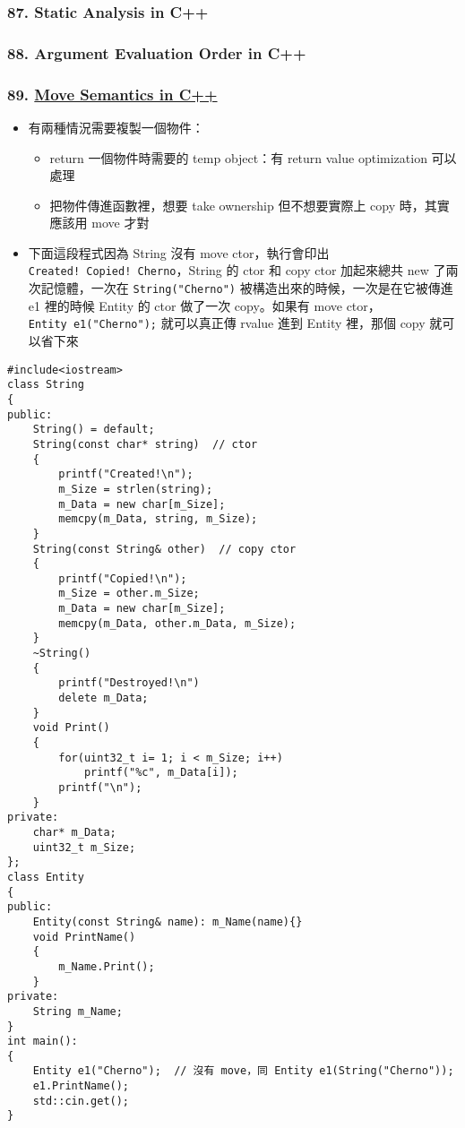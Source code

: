 \documentclass[11pt]{article}
\providecommand{\tightlist}{%
      \setlength{\itemsep}{0pt}\setlength{\parskip}{0pt}}
\begin{document}
\hypertarget{static-analysis-in-c}{%
\subsubsection{87. Static Analysis in C++}\label{static-analysis-in-c}}

\hypertarget{argument-evaluation-order-in-c}{%
\subsubsection{88. Argument Evaluation Order in
C++}\label{argument-evaluation-order-in-c}}

\hypertarget{move-semantics-in-c}{%
\subsubsection{\texorpdfstring{89.
\href{https://youtu.be/ehMg6zvXuMY?list=PLlrATfBNZ98dudnM48yfGUldqGD0S4FFb\&t=209}{Move
Semantics in
C++}}{89. Move Semantics in C++}}\label{move-semantics-in-c}}

\begin{itemize}
\tightlist
\item
  有兩種情況需要複製一個物件：

  \begin{itemize}
  \tightlist
  \item
    return 一個物件時需要的 temp object：有 return value optimization
    可以處理
  \item
    把物件傳進函數裡，想要 take ownership 但不想要實際上 copy
    時，其實應該用 move 才對
  \end{itemize}
\item
  下面這段程式因為 String 沒有 move ctor，執行會印出
  \texttt{Created!\ Copied!\ Cherno}，String 的 ctor 和 copy ctor
  加起來總共 new 了兩次記憶體，一次在 \texttt{String("Cherno")}
  被構造出來的時候，一次是在它被傳進 e1 裡的時候 Entity 的 ctor 做了一次
  copy。如果有 move ctor，\texttt{Entity\ e1("Cherno");} 就可以真正傳
  rvalue 進到 Entity 裡，那個 copy 就可以省下來
\end{itemize}

\begin{verbatim}
#include<iostream>
class String
{
public: 
    String() = default;
    String(const char* string)  // ctor
    {
        printf("Created!\n");
        m_Size = strlen(string);
        m_Data = new char[m_Size];
        memcpy(m_Data, string, m_Size);
    }
    String(const String& other)  // copy ctor
    {
        printf("Copied!\n");
        m_Size = other.m_Size;
        m_Data = new char[m_Size];
        memcpy(m_Data, other.m_Data, m_Size);
    }
    ~String()
    {
        printf("Destroyed!\n")
        delete m_Data;
    }
    void Print()
    {
        for(uint32_t i= 1; i < m_Size; i++)
            printf("%c", m_Data[i]);
        printf("\n");
    }
private:
    char* m_Data;
    uint32_t m_Size;
};
class Entity
{
public:
    Entity(const String& name): m_Name(name){}
    void PrintName()
    {
        m_Name.Print();
    }
private:
    String m_Name;
}
int main():
{
    Entity e1("Cherno");  // 沒有 move，同 Entity e1(String("Cherno"));
    e1.PrintName();
    std::cin.get();
}
\end{verbatim}
\end{document}
